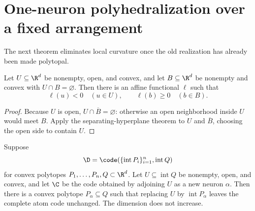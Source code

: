 \section{One-neuron polyhedralization over a fixed arrangement}
\label{sec:fixed-arrangement}

The next theorem eliminates local curvature once the old realization has already been made polytopal.

\begin{lemma}
\label{lem:open-separation}
Let $U\subseteq\R^d$ be nonempty, open, and convex, and let $B\subseteq\R^d$ be nonempty and convex with $U\cap B=\varnothing$.  Then there is an affine functional $\ell$ such that
\[
 \ell(u)<0\quad(u\in U),
 \qquad
 \ell(b)\ge0\quad(b\in B).
\]
\end{lemma}

\begin{proof}
Because $U$ is open, $U\cap\overline B=\varnothing$: otherwise an open neighborhood inside $U$ would meet $B$.  Apply the separating-hyperplane theorem to $U$ and $\overline B$, choosing the open side to contain $U$.
\end{proof}

\begin{theorem}
\label{thm:fixed-arrangement}
Suppose
\[
 \D=\code(\{\operatorname{int}P_i\}_{i=1}^n,\operatorname{int}Q)
\]
for convex polytopes $P_1,\ldots,P_n,Q\subset\R^d$.  Let $U\subseteq\operatorname{int}Q$ be nonempty, open, and convex, and let $\C$ be the code obtained by adjoining $U$ as a new neuron $\alpha$.  Then there is a convex polytope $P_\alpha\subseteq Q$ such that replacing $U$ by $\operatorname{int}P_\alpha$ leaves the complete atom code unchanged.  The dimension does not increase.
\end{theorem}

